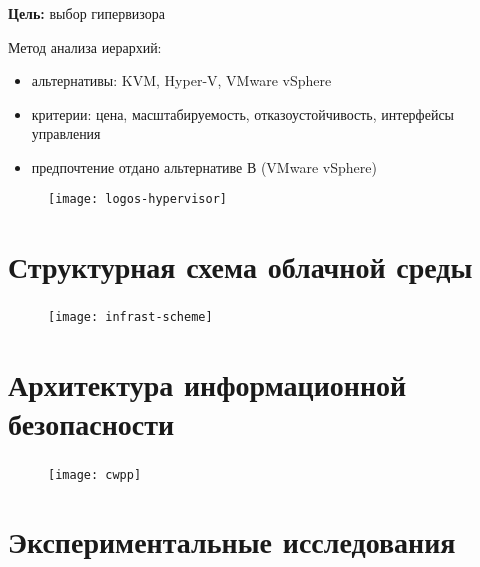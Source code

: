 \begin{frame}
\frametitle{\insertsection}

\textbf{Цель:} выбор гипервизора

Метод анализа иерархий:
\begin{itemize}
    \item альтернативы: KVM, Hyper-V, VMware vSphere
    \item критерии: цена, масштабируемость, отказоустойчивость, интерфейсы управления
    \item предпочтение отдано альтернативе В (VMware vSphere)
\end{itemize}

\begin{figure}
    \center
    \texttt{[image: logos-hypervisor]}
\end{figure}
\end{frame}


\section{Структурная схема облачной среды}

\begin{frame}
\frametitle{\insertsection}

\begin{figure}
    \center
    \texttt{[image: infrast-scheme]}
\end{figure}
\end{frame}


\section{Архитектура информационной безопасности}

\begin{frame}
\frametitle{\insertsection}

\begin{figure}
    \center
    \texttt{[image: cwpp]}
\end{figure}
\end{frame}


\section{Экспериментальные исследования}

